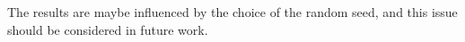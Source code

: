 The results are maybe influenced by the choice of the random seed, and this issue should be considered in future work.
